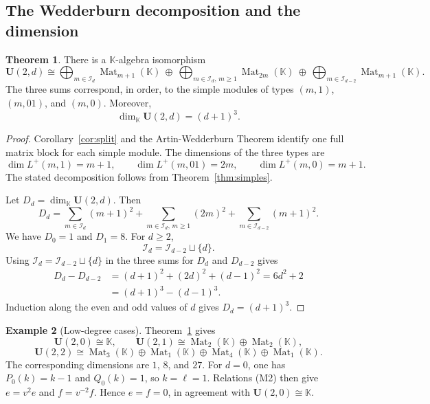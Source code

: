 \documentclass[12pt]{amsart}
\numberwithin{equation}{section}
\theoremstyle{definition}
\newtheorem{theorem}{Theorem}[section]
\theoremstyle{definition}
\newtheorem{example}[theorem]{Example}
\newcommand{\kk}{\mathbb K}
\newcommand{\Ufd}{\mathbf U(2,d)}
\newcommand{\Mat}{\operatorname{Mat}}
\newcommand{\Iset}{\mathcal I}
\begin{document}
\subsection{The Wedderburn decomposition and the dimension}\label{subsec:wed}

\begin{theorem}\label{thm:wed}
There is a $\kk$-algebra isomorphism
$$
\Ufd\cong
\bigoplus_{m\in\Iset_d}\Mat_{m+1}(\kk)
\ \oplus\
\bigoplus_{m\in\Iset_d,\, m\ge1}\Mat_{2m}(\kk)
\ \oplus\
\bigoplus_{m\in\Iset_{d-2}}\Mat_{m+1}(\kk).
$$
The three sums correspond, in order, to the simple modules of types $(m,1)$, $(m,01)$, and $(m,0)$. Moreover,
$$
\dim_{\kk}\Ufd=(d+1)^3.
$$
\end{theorem}
\begin{proof}
Corollary~\ref{cor:split} and the Artin-Wedderburn Theorem identify one full matrix block for each simple module. The dimensions of the three types are
$$
\dim L^+(m,1)=m+1,
\qquad
\dim L^+(m,01)=2m,
\qquad
\dim L^+(m,0)=m+1.
$$
The stated decomposition follows from Theorem~\ref{thm:simples}.

Let $D_d=\dim_{\kk}\Ufd$. Then
$$
D_d=
\sum_{m\in\Iset_d}(m+1)^2
+
\sum_{m\in\Iset_d,\, m\ge1}(2m)^2
+
\sum_{m\in\Iset_{d-2}}(m+1)^2.
$$
We have $D_0=1$ and $D_1=8$. For $d\ge2$,
$$
\Iset_d=\Iset_{d-2}\sqcup\{d\}.
$$
Using $\Iset_d=\Iset_{d-2}\sqcup\{d\}$ in the three sums for $D_d$ and $D_{d-2}$ gives
$$
\begin{aligned}
D_d-D_{d-2}
&=(d+1)^2+(2d)^2+(d-1)^2=6d^2+2\\
&=(d+1)^3-(d-1)^3.
\end{aligned}
$$
Induction along the even and odd values of $d$ gives $D_d=(d+1)^3$.
\end{proof}


\begin{example}[Low-degree cases]\label{ex:small-d}
Theorem~\ref{thm:wed} gives
$$
\mathbf U(2,0)\cong\kk,\qquad \mathbf U(2,1)\cong
\Mat_2(\kk)\oplus\Mat_2(\kk),
$$
$$
\mathbf U(2,2)\cong
\Mat_3(\kk)\oplus\Mat_1(\kk)\oplus
\Mat_4(\kk)\oplus\Mat_1(\kk).
$$
The corresponding dimensions are $1$, $8$, and $27$. For $d=0$, one has $P_0(k)=k-1$ and $Q_0(k)=1$, so $k=\ell=1$. 
Relations \textup{(M2)} then give $e=v^2e$ and $f=v^{-2}f$. Hence $e=f=0$, in agreement with $\mathbf U(2,0)\cong\kk$.
\end{example}

\end{document}
